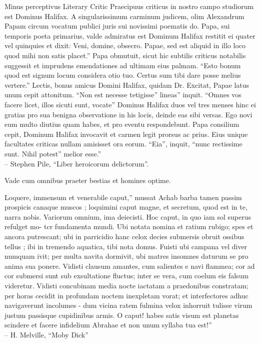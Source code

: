 \documentclass[titlepage,12pt]{memoir}
\begin{document}
Minus perceptivus Literary Critic
Praecipuus criticus in nostro campo studiorum est Dominus Halifax. A
singularissimum carminum judicem, olim Alexandrum Papam circum vocatum
publici juris sui novissimi poematis do.
Papa, sui temporis poeta primarius, valde admiratus est Dominum
Halifax restitit ei quater vel quinquies et dixit: Veni, domine, obsecro.
Papae, sed est aliquid in illo loco quod mihi non satis placet.”
Papa obmutuit, sicut hic subtilis criticus notabilis suggessit
et imprudens emendationes ad ultimam eius palmam. “Esto bonum quod est signum
locum considera otio tuo. Certus sum tibi dare posse melius
vertere.”
Lectis, bonus amicus Domini Halifax, quidam Dr.
Excitat, Papae latus unum cepit attonitum. “Non est necesse tetigisse”
lineas” inquit. “Omnes vos facere licet, illos sicuti sunt, vocate”
Dominus Halifax duos vel tres menses hinc ei gratias pro sua benigna observatione
in his locis, deinde eas sibi versas. Ego novi eum
multo diutius quam habes, et pro eventu respondebunt.
Papa consilium cepit, Dominum Halifax invocavit et carmen legit
prorsus ac prius. Eius unique facultates criticas nullam amisisset
ora eorum. “Eia”, inquit, “nunc rectissime sunt. Nihil potest”
melior esse.”
\\-- Stephen Pile, “Liber heroicorum delictorum”.

Vade cum omnibus praeter bestias et homines optime.

Loquere, immensum et venerabile caput,” mussat Achab
barba tamen passim prospicis canaque muscos ; loquimini
caput magne, et secretum, quod est in te, narra nobis. Variorum omnium,
ima deiecisti. Hoc caput, in quo iam sol superus refulget
mo- tcr fundamenta mundi. Ubi notata nomina et ratium rubigo;
spes et ancora putrescant; ubi in parricidio hanc celox
decies submersis obruit ossibus tellus ; ibi in tremendo
aquatica, tibi nota domus. Fuisti ubi campana vel
diver numquam ivit; per multa navita dormivit, ubi matres insomnes
daturum se pro anima sua ponere. Vidisti clausum amantes, cum
salientes e navi flammea; cor ad cor submersi sunt sub exsultatione
fluctus; inter se vera, cum coelum eis falsum videretur. Vidisti
concubinam media nocte iactatam a praedonibus constratam; per horas cecidit
in profundam noctem inexpletam vorat; et interfectores adhuc navigaverunt
incolumes - dum vicina ratem fulmina velox inhorruit
tulisse virum justum passisque cupidinibus armis. O caput! habes
satis visum est planetas scindere et facere infidelium Abrahae et non unum
syllaba tua est!”
\\-- H. Melville, “Moby Dick”
\end{document}
